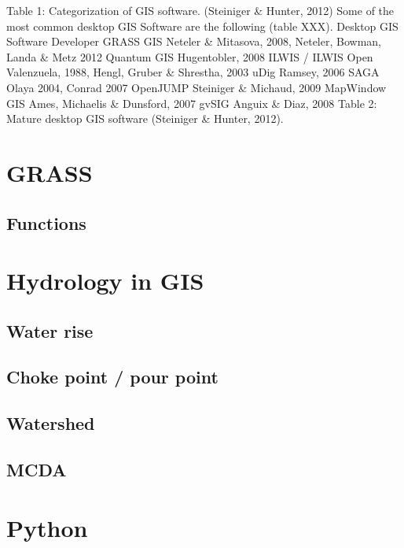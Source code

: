 Table 1: Categorization of GIS software. (Steiniger \& Hunter, 2012)
Some of the most common desktop GIS Software are the following (table XXX).
Desktop GIS Software
Developer
GRASS GIS
Neteler \& Mitasova, 2008, Neteler, Bowman, Landa \& Metz 2012
Quantum GIS
Hugentobler, 2008
ILWIS / ILWIS Open
Valenzuela, 1988, Hengl, Gruber \& Shrestha, 2003
uDig
Ramsey, 2006
SAGA
Olaya 2004, Conrad 2007
OpenJUMP
Steiniger \& Michaud, 2009
MapWindow GIS
Ames, Michaelis \& Dunsford, 2007
gvSIG
Anguix \& Diaz, 2008
Table 2: Mature desktop GIS software (Steiniger \& Hunter, 2012).



\section{GRASS}\label{sec:options}
\subsection*{Functions}



\section{Hydrology in GIS}\label{sec:custom}

\subsection*{Water rise}

\subsection*{Choke point / pour point}

\subsection*{Watershed}

\subsection*{MCDA}


\section{Python}\label{sec:issues}

